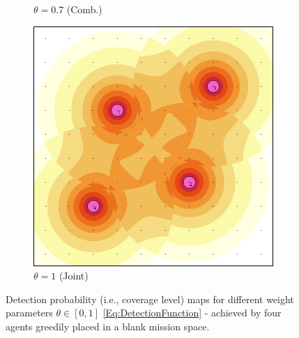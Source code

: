 \documentclass[letterpaper, 10 pt, conference]{ieeeconf}
\begin{document}
\begin{figure}[!h]
\begin{subfigure}[t]{0.4\columnwidth}
        \caption{$\theta = 0.7$ (Comb.)}
    \end{subfigure}%
    \hfill
    \begin{subfigure}[t]{0.4\columnwidth}
        \centering
        \includegraphics[width=\columnwidth]{Figures/DetFun_100.png}
        \caption{$\theta = 1$ (Joint)}
    \end{subfigure}%
    \caption{Detection probability (i.e., coverage level) maps for different weight parameters $\theta \in [0,1]$ \eqref{Eq:DetectionFunction} - achieved by four agents greedily placed in a blank mission space.}
    \label{Fig:DetectionFunction}
\end{figure}
\end{document}
